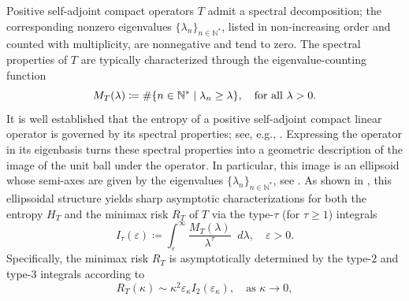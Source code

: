 \documentclass[a4paper,12pt]{article}
\let\originalleft\left
\let\originalright\right
\renewcommand{\left}{\mathopen{}\mathclose\bgroup\originalleft}
\renewcommand{\right}{\aftergroup\egroup\originalright}
\newcommand{\N}{\mathbb{N}}
\newcommand{\diff}{\mathop{}\!d}
\begin{document}
Positive self-adjoint compact operators $T$ admit a spectral decomposition; the corresponding nonzero eigenvalues $\{\lambda_n\}_{n\in\N^*}$, listed in non-increasing order and counted with %
multiplicity, are nonnegative and tend to zero.
The spectral properties of $T$ are typically characterized through the eigenvalue-counting function
\begin{equation}\label{eq:definition-ecf}
    M_T(\lambda) \coloneqq  \# \left\{n\in\N^* \mid \lambda_n \geq \lambda \right\},
    \quad \text{for all } \lambda>0.
\end{equation}
It is well established that the entropy of a positive self-adjoint compact linear operator is governed by its spectral properties;
see, e.g., \cite{ab2025compactoperators,prosserEEntropyECapacityCertain1966,carlInequalitiesEigenvaluesEntropy1980,carl1981entropy,konigEigenvalueDistributionCompact1986,edmundsFunctionSpacesEntropy1996}.
Expressing the operator in its eigenbasis turns these spectral properties into a geometric description of the image of the unit ball under the operator. In particular, this image is an ellipsoid whose semi-axes are given by the eigenvalues $\{\lambda_n\}_{n\in\N^*}$, see \cite{ab2025compactoperators}.
As shown in \cite[Theorems~2, 4, and 5]{allard2025metricentropyminimaxrisk}, this ellipsoidal structure yields 
sharp asymptotic characterizations for both the %
entropy $H_T$ and the minimax risk $R_T$ of $T$ via the type-$\tau$ (for $\tau \geq 1$) integrals \begin{equation}\label{eq:type-tau-integrals}
    I_\tau (\varepsilon) \coloneqq \int_{\varepsilon}^{\infty} \frac{M_T(\lambda)}{\lambda^\tau}\diff \lambda, \quad 
    \varepsilon > 0.
\end{equation}
Specifically, the minimax risk $R_T$ %
is asymptotically determined by the type-$2$ and type-$3$ integrals according to
\begin{equation}\label{eq:integral-ecf-risk}
    R_T (\kappa)
    \sim \kappa^2 \varepsilon_\kappa I_2(\varepsilon_\kappa),
    \quad \text{as } \kappa \rightarrow 0,
\end{equation}
\end{document}
